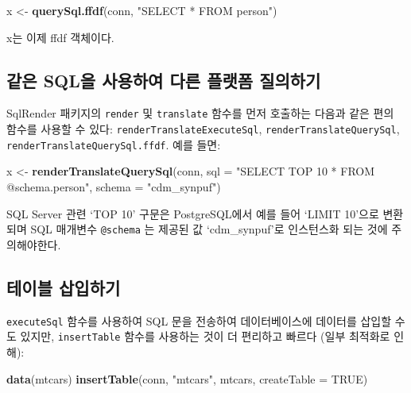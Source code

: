 \documentclass[11pt]{book}
\newenvironment{Shaded}{\begin{snugshade}}{\end{snugshade}}
\newcommand{\KeywordTok}[1]{\textcolor[rgb]{0.13,0.29,0.53}{\textbf{#1}}}
\newcommand{\DataTypeTok}[1]{\textcolor[rgb]{0.13,0.29,0.53}{#1}}
\newcommand{\StringTok}[1]{\textcolor[rgb]{0.31,0.60,0.02}{#1}}
\newcommand{\OtherTok}[1]{\textcolor[rgb]{0.56,0.35,0.01}{#1}}
\newcommand{\NormalTok}[1]{#1}
\theoremstyle{definition}
\theoremstyle{definition}
\theoremstyle{definition}
\theoremstyle{remark}
\begin{document}
\begin{Shaded}
\begin{Highlighting}[]
\NormalTok{x <-}\StringTok{ }\KeywordTok{querySql.ffdf}\NormalTok{(conn, }\StringTok{"SELECT * FROM person"}\NormalTok{)}
\end{Highlighting}
\end{Shaded}

x는 이제 ffdf 객체이다.

\subsection{같은 SQL을 사용하여 다른 플랫폼 질의하기}\label{-sql----}

SqlRender 패키지의 \texttt{render} 및 \texttt{translate} 함수를 먼저
호출하는 다음과 같은 편의 함수를 사용할 수 있다:
\texttt{renderTranslateExecuteSql}, \texttt{renderTranslateQuerySql},
\texttt{renderTranslateQuerySql.ffdf}. 예를 들면:

\begin{Shaded}
\begin{Highlighting}[]
\NormalTok{x <-}\StringTok{ }\KeywordTok{renderTranslateQuerySql}\NormalTok{(conn, }
                             \DataTypeTok{sql =} \StringTok{"SELECT TOP 10 * FROM @schema.person"}\NormalTok{,}
                             \DataTypeTok{schema =} \StringTok{"cdm_synpuf"}\NormalTok{)}
\end{Highlighting}
\end{Shaded}

SQL Server 관련 `TOP 10' 구문은 PostgreSQL에서 예를 들어 `LIMIT 10'으로
변환되며 SQL 매개변수 \texttt{@schema} 는 제공된 값 `cdm\_synpuf'로
인스턴스화 되는 것에 주의해야한다.

\subsection{테이블 삽입하기}\label{-}

\texttt{executeSql} 함수를 사용하여 SQL 문을 전송하여 데이터베이스에
데이터를 삽입할 수도 있지만, \texttt{insertTable} 함수를 사용하는 것이
더 편리하고 빠르다 (일부 최적화로 인해):

\begin{Shaded}
\begin{Highlighting}[]
\KeywordTok{data}\NormalTok{(mtcars)}
\KeywordTok{insertTable}\NormalTok{(conn, }\StringTok{"mtcars"}\NormalTok{, mtcars, }\DataTypeTok{createTable =} \OtherTok{TRUE}\NormalTok{)}
\end{Highlighting}
\end{Shaded}
\end{document}
